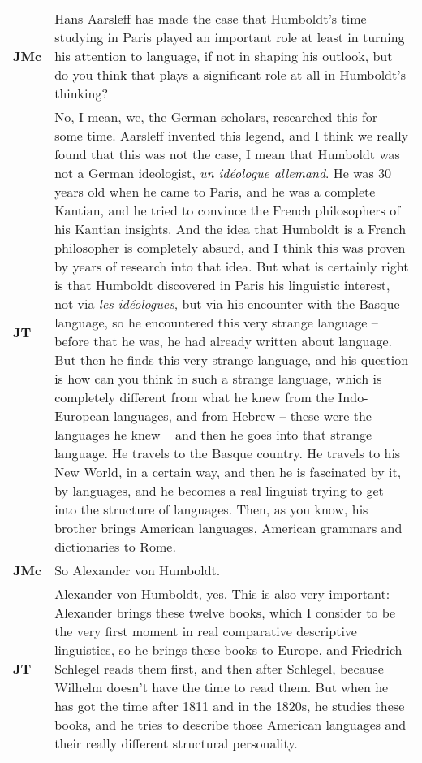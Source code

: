 \documentclass[12pt]{article}
\begin{document}
\begin{flushleft}
\begin{supertabular}{m{0.24415985in}m{5.89766in}}
\textbf{JMc}\newline
 &
Hans Aarsleff has made the case that Humboldt’s time studying in Paris played an important role at least in turning his attention to language, if not in shaping his outlook, but do you think that plays a significant role at all in Humboldt’s thinking?\\
\textbf{JT}\newline
 &
No, I mean, we, the German scholars, researched this for some time. Aarsleff invented this legend, and I think we really found that this was not the case, I mean that Humboldt was not a German ideologist, \textit{un idéologue allemand}. He was 30 years old when he came to Paris, and he was a complete Kantian, and he tried to convince the French philosophers of his Kantian insights. And the idea that Humboldt is a French philosopher is completely absurd, and I think this was proven by years of research into that idea. But what is certainly right is that Humboldt discovered in Paris his linguistic interest, not via \textit{les idéologues}, but via his encounter with the Basque language, so he encountered this very strange language – before that he was, he had already written about language. But then he finds this very strange language, and his question is how can you think in such a strange language, which is completely different from what he knew from the Indo-European languages, and from Hebrew – these were the languages he knew – and then he goes into that strange language. He travels to the Basque country. He travels to his New World, in a certain way, and then he is fascinated by it, by languages, and he becomes a real linguist trying to get into the structure of languages. Then, as you know, his brother brings American languages, American grammars and dictionaries to Rome.\\
\textbf{JMc}\newline
 &
So Alexander von Humboldt.\\
\textbf{JT}\newline
 &
Alexander von Humboldt, yes. This is also very important: Alexander brings these twelve books, which I consider to be the very first moment in real comparative descriptive linguistics, so he brings these books to Europe, and Friedrich Schlegel reads them first, and then after Schlegel, because Wilhelm doesn’t have the time to read them. But when he has got the time after 1811 and in the 1820s, he studies these books, and he tries to describe those American languages and their really different structural personality. 


\end{supertabular}
\end{flushleft}
\end{document}
